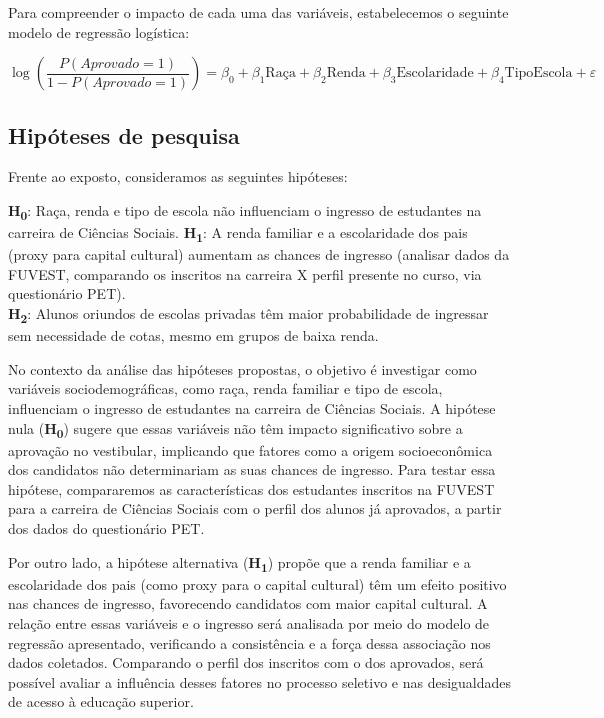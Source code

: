 \documentclass[
]{article}
\begin{document}
Para compreender o impacto de cada uma das variáveis, estabelecemos o
seguinte modelo de regressão logística:

\[
\log \left(\frac{P(Aprovado=1)}{1 - P(Aprovado=1)}\right) = \beta_0 + \beta_1 \text{Raça} + \beta_2 \text{Renda} + \beta_3 \text{Escolaridade} + \beta_4 \text{TipoEscola} + \varepsilon
\]

\subsection{Hipóteses de pesquisa}\label{hipuxf3teses-de-pesquisa}

Frente ao exposto, consideramos as seguintes hipóteses:

\textbf{H\textsubscript{0}}: Raça, renda e tipo de escola não
influenciam o ingresso de estudantes na carreira de Ciências Sociais.
\textbf{H\textsubscript{1}}: A renda familiar e a escolaridade dos pais
(proxy para capital cultural) aumentam as chances de ingresso (analisar
dados da FUVEST, comparando os inscritos na carreira X perfil presente
no curso, via questionário PET).\\
\textbf{H\textsubscript{2}}: Alunos oriundos de escolas privadas têm
maior probabilidade de ingressar sem necessidade de cotas, mesmo em
grupos de baixa renda.

No contexto da análise das hipóteses propostas, o objetivo é investigar
como variáveis sociodemográficas, como raça, renda familiar e tipo de
escola, influenciam o ingresso de estudantes na carreira de Ciências
Sociais. A hipótese nula (\textbf{H\textsubscript{0}}) sugere que essas
variáveis não têm impacto significativo sobre a aprovação no vestibular,
implicando que fatores como a origem socioeconômica dos candidatos não
determinariam as suas chances de ingresso. Para testar essa hipótese,
compararemos as características dos estudantes inscritos na FUVEST para
a carreira de Ciências Sociais com o perfil dos alunos já aprovados, a
partir dos dados do questionário PET.

Por outro lado, a hipótese alternativa (\textbf{H\textsubscript{1}})
propõe que a renda familiar e a escolaridade dos pais (como proxy para o
capital cultural) têm um efeito positivo nas chances de ingresso,
favorecendo candidatos com maior capital cultural. A relação entre essas
variáveis e o ingresso será analisada por meio do modelo de regressão
apresentado, verificando a consistência e a força dessa associação nos
dados coletados. Comparando o perfil dos inscritos com o dos aprovados,
será possível avaliar a influência desses fatores no processo seletivo e
nas desigualdades de acesso à educação superior.
\end{document}

